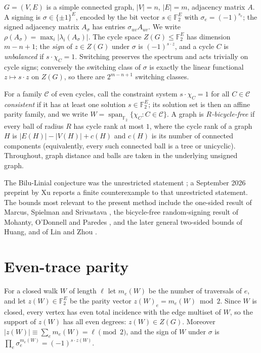 \documentclass[11pt]{article}
\theoremstyle{remark}
\newcommand{\F}{\mathbb{F}}
\newcommand{\rhomax}{\rho}
\begin{document}
$G=(V,E)$ is a simple connected graph, $|V|=n$, $|E|=m$, adjacency matrix
$A$. A signing is $\sigma\in\{\pm1\}^E$, encoded by the bit vector
$s\in\F_2^E$ with $\sigma_e=(-1)^{s_e}$; the signed adjacency matrix
$A_\sigma$ has entries $\sigma_{uv}A_{uv}$. We write
$\rhomax(A_\sigma)=\max_i|\lambda_i(A_\sigma)|$. The cycle space
$Z(G)\le\F_2^E$ has dimension $m-n+1$; the \emph{sign} of $z\in Z(G)$
under $\sigma$ is $(-1)^{s\cdot z}$, and a cycle $C$ is \emph{unbalanced}
if $s\cdot\chi_C=1$. Switching preserves the spectrum and acts trivially
on cycle signs; conversely the switching class of $\sigma$ is exactly the
linear functional $z\mapsto s\cdot z$ on $Z(G)$, so there are
$2^{m-n+1}$ switching classes.

For a family $\mathcal C$ of even cycles, call the constraint system
$s\cdot\chi_C=1$ for all $C\in\mathcal C$ \emph{consistent} if it has
at least one solution $s\in\F_2^E$; its solution set is then an affine
parity family, and we write $W=\operatorname{span}_{\F_2}\{\chi_C:C\in\mathcal C\}$.
A graph is \emph{$R$-bicycle-free} if every ball of radius $R$ has cycle
rank at most $1$, where the cycle rank of a graph $H$ is
$|E(H)|-|V(H)|+c(H)$ and $c(H)$ is its number of connected components
(equivalently, every such connected ball is a tree or unicyclic).
Throughout, graph distance and balls are taken in the underlying
unsigned graph.

The Bilu-Linial conjecture was the unrestricted statement
\cite{bilulinial06}; a September 2026 preprint by Xu \cite{xu26counter}
reports a finite counterexample to that unrestricted statement. The bounds most relevant to the present method
include the one-sided result of Marcus, Spielman and Srivastava
\cite{mss15}, the bicycle-free random-signing result of Mohanty, O'Donnell
and Paredes \cite{mop20}, and the later general two-sided bounds of Huang, and of Lin and Zhou
\cite{huang26,linzhou26}.

\section{Even-trace parity}

For a closed walk $W$ of length $\ell$ let $m_e(W)$ be the number of
traversals of $e$, and let $z(W)\in\F_2^E$ be the parity vector
$z(W)_e=m_e(W)\bmod 2$. Since $W$ is closed, every vertex has even total
incidence with the edge multiset of $W$, so the support of $z(W)$ has all
even degrees: $z(W)\in Z(G)$. Moreover
$|z(W)|\equiv\sum_e m_e(W)=\ell\pmod 2$, and the sign of $W$ under
$\sigma$ is $\prod_e\sigma_e^{m_e(W)}=(-1)^{s\cdot z(W)}$.
\end{document}
